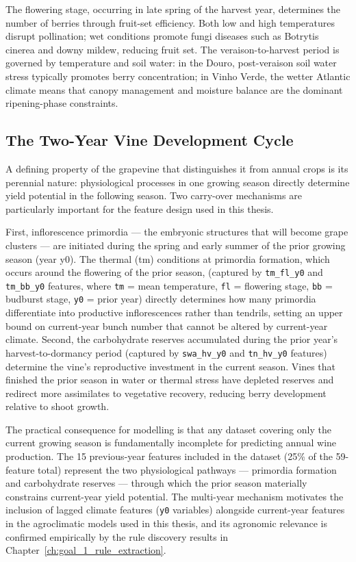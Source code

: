The flowering stage, occurring in late spring of the harvest year, determines the number of berries through fruit-set efficiency. Both low and high temperatures disrupt pollination; wet conditions promote fungi diseases such as Botrytis cinerea and downy mildew, reducing fruit set. The veraison-to-harvest period is governed by temperature and soil water: in the Douro, post-veraison soil water stress typically promotes berry concentration; in Vinho Verde, the wetter Atlantic climate means that canopy management and moisture balance are the dominant ripening-phase constraints.



\subsection{The Two-Year Vine Development Cycle}\label{sub:the_twoyear_vine_development}

A defining property of the grapevine that distinguishes it from annual crops is its perennial nature: physiological processes in one growing season directly determine yield potential in the following season. Two carry-over mechanisms are particularly important for the feature design used in this thesis.

First, inflorescence primordia --- the embryonic structures that will become grape clusters --- are initiated during the spring and early summer of the prior growing season (year y0). The thermal (tm) conditions at primordia formation, which occurs around the flowering of the prior season, (captured by \texttt{tm\_fl\_y0} and \texttt{tm\_bb\_y0} features, where \texttt{tm} = mean temperature, \texttt{fl} = flowering stage, \texttt{bb} = budburst stage, \texttt{y0} = prior year) directly determines how many primordia differentiate into productive inflorescences rather than tendrils, setting an upper bound on current-year bunch number that cannot be altered by current-year climate. Second, the carbohydrate reserves accumulated during the prior year's harvest-to-dormancy period (captured by \texttt{swa\_hv\_y0} and \texttt{tn\_hv\_y0} features) determine the vine's reproductive investment in the current season. Vines that finished the prior season in water or thermal stress have depleted reserves and redirect more assimilates to vegetative recovery, reducing berry development relative to shoot growth.

The practical consequence for modelling is that any dataset covering only the current growing season is fundamentally incomplete for predicting annual wine production. The 15 previous-year features included in the dataset (25\% of the 59-feature total) represent the two physiological pathways --- primordia formation and carbohydrate reserves --- through which the prior season materially constrains current-year yield potential. The multi-year mechanism motivates the inclusion of lagged climate features (\texttt{y0} variables) alongside current-year features in the agroclimatic models used in this thesis, and its agronomic relevance is confirmed empirically by the rule discovery results in Chapter~\ref{ch:goal_1_rule_extraction}.

